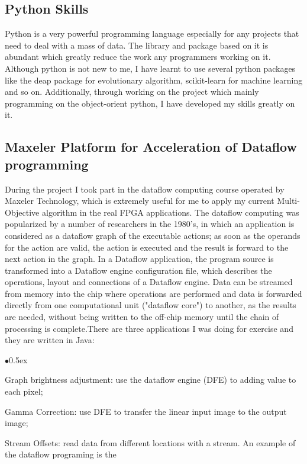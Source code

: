 \documentclass[12pt, runningheads,a4paper]{llncs}
\begin{document}
\subsection{Python Skills}
Python is a very powerful programming language especially for any projects that need to deal with a mass of data. The library and package based on it is abundant which greatly reduce the work any programmers working on it. Although python is not new to me, I have learnt to use several python packages like the deap package for evolutionary algorithm, scikit-learn for machine learning and so on. Additionally, through working on the project which mainly programming on the object-orient python, I have developed my skills greatly on it.

\subsection{Maxeler Platform for Acceleration of Dataflow programming}
During the project I took part in the dataflow computing course operated by Maxeler Technology, which is extremely useful for me to apply my current Multi-Objective algorithm in the real FPGA applications. The dataflow computing was popularized by a number of researchers in the 1980's, in which an application is considered as a dataflow graph of the executable actions; as soon as the operands for the action are valid, the action is executed and the result is forward to the next action in the graph. In a Dataflow application, the program source is transformed into a Dataflow engine configuration file, which describes the operations, layout and connections of a Dataflow engine. Data can be streamed from memory into the chip where operations are performed and data is forwarded directly from one computational unit ("dataflow core") to another, as the results are needed, without being written to the off-chip memory until the chain of processing is complete.There are three applications I was doing for exercise and they are written in Java: 
\begin{list}{$\bullet$}{\itemsep 0.5ex}
\item Graph brightness adjustment: use the dataflow engine (DFE) to adding value to each pixel; 
\item Gamma Correction: use DFE to transfer the linear input image to the output image; 
\item Stream Offsets: read data from different locations with a stream. An example of the dataflow programing is the 
\end{list}
\end{document}
